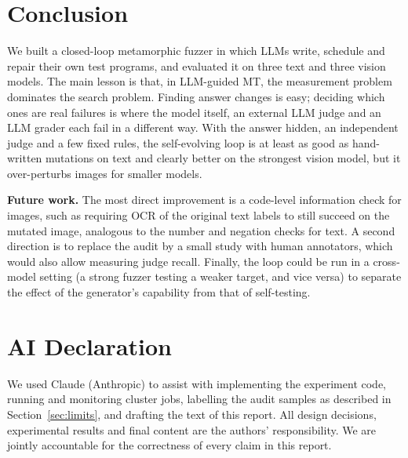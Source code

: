 \documentclass[sigconf]{acmart}
\begin{document}
\section{Conclusion}

We built a closed-loop metamorphic fuzzer in which LLMs write, schedule and repair their own test programs, and
evaluated it on three text and three vision models. The main lesson is that, in LLM-guided MT, the measurement problem
dominates the search problem. Finding answer changes is easy; deciding which ones are real failures is where the model
itself, an external LLM judge and an LLM grader each fail in a different way. With the answer hidden, an independent
judge and a few fixed rules, the self-evolving loop is at least as good as hand-written mutations on text and clearly
better on the strongest vision model, but it over-perturbs images for smaller models.

\textbf{Future work.} The most direct improvement is a code-level information check for images, such as requiring OCR
of the original text labels to still succeed on the mutated image, analogous to the number and negation checks for
text. A second direction is to replace the audit by a small study with human annotators, which would also allow
measuring judge recall. Finally, the loop could be run in a cross-model setting (a strong fuzzer testing a weaker
target, and vice versa) to separate the effect of the generator's capability from that of self-testing.


\section*{AI Declaration}

We used Claude (Anthropic) to assist with implementing the experiment code, running and monitoring cluster jobs,
labelling the audit samples as described in Section~\ref{sec:limits}, and drafting the text of this report. All design
decisions, experimental results and final content are the authors' responsibility. We are jointly accountable for the
correctness of every claim in this report.
\end{document}
